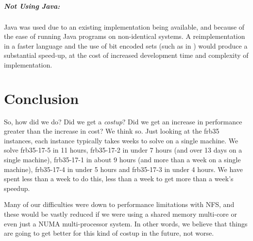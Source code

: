 \documentclass{l4proj}
\begin{document}
\paragraph{Not Using Java:}
Java was used due to an existing implementation being available, and because of
the ease of running Java programs on non-identical systems. A reimplementation
in a faster language and the use of bit encoded sets (such as in \cite{segundo2011}) would produce a substantial
speed-up, at the cost of increased development time and complexity of
implementation. 

%
\chapter{Conclusion}
So, how did we do? Did we get a \emph{costup}? Did we get an increase in performance greater than the increase in cost?
We think so. Just looking at the frb35 instances, each instance typically takes weeks to solve on a single machine. We solve frb35-17-5 in
11 hours, frb35-17-2 in under 7 hours (and over 13 days on a single machine), frb35-17-1 in about 9 hours 
(and more than a week on a single machine),
frb35-17-4 in under 5 hours and frb35-17-3 in under 4 hours. We have spent less
than a week to do this, less than a week to get more than a week's speedup.

Many of our difficulties were down to performance limitations with NFS, 
and these would be vastly reduced if we were using a shared memory multi-core or even just a NUMA multi-processor system. 
In other words, we believe that things are going to get better for this kind of costup in the future, not worse.
\end{document}
